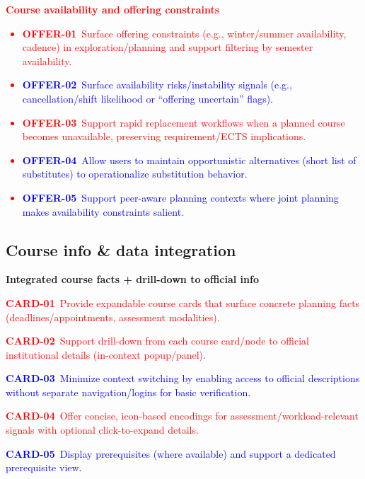 \textcolor{red}{\textbf{Course availability and offering constraints}
\begin{itemize}
  \item \textbf{OFFER-01}~Surface offering constraints (e.g., winter/summer availability, cadence) in exploration/planning and support filtering by semester availability.
  \item \textcolor{blue}{\textbf{OFFER-02}~Surface availability risks/instability signals (e.g., cancellation/shift likelihood or “offering uncertain” flags).}
  \item \textbf{OFFER-03}~Support rapid replacement workflows when a planned course becomes unavailable, preserving requirement/ECTS implications.
  \item \textcolor{blue}{\textbf{OFFER-04}~Allow users to maintain opportunistic alternatives (short list of substitutes) to operationalize substitution behavior.}
  \item \textcolor{blue}{\textbf{OFFER-05}~Support peer-aware planning contexts where joint planning makes availability constraints salient.}
\end{itemize}}


\subsection*{Course info \& data integration}

\textbf{Integrated course facts + drill-down to official info}
\begin{itemize}
  \textcolor{red}{\item \textbf{CARD-01}~Provide expandable course cards that surface concrete planning facts (deadlines/appointments, assessment modalities).}
  \item \textcolor{red}{\textbf{CARD-02}~Support drill-down from each course card/node to official institutional details (in-context popup/panel).}
  \item \textcolor{blue}{\textbf{CARD-03}~Minimize context switching by enabling access to official descriptions without separate navigation/logins for basic verification.}
  \item \textcolor{red}{\textbf{CARD-04}~Offer concise, icon-based encodings for assessment/workload-relevant signals with optional click-to-expand details.}
  \item \textcolor{blue}{\textbf{CARD-05}~Display prerequisites (where available) and support a dedicated prerequisite view.}
\end{itemize}


